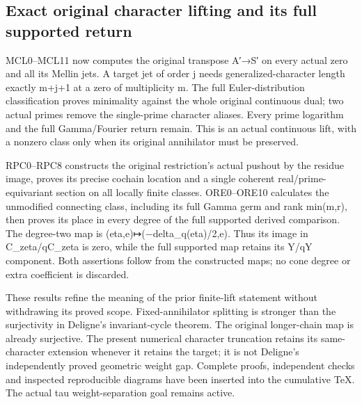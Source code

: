 \subsection{Exact original character lifting and its full supported
return}\label{exact-original-character-lifting-and-its-full-supported-return}

MCL0--MCL11 now computes the original transpose A′→S′ on every actual
zero and all its Mellin jets. A target jet of order j needs
generalized-character length exactly m+j+1 at a zero of multiplicity m.
The full Euler-distribution classification proves minimality against the
whole original continuous dual; two actual primes remove the
single-prime character aliases. Every prime logarithm and the full
Gamma/Fourier return remain. This is an actual continuous lift, with a
nonzero class only when its original annihilator must be preserved.

RPC0--RPC8 constructs the original restriction's actual pushout by the
residue image, proves its precise cochain location and a single coherent
real/prime-equivariant section on all locally finite classes.
ORE0--ORE10 calculates the unmodified connecting class, including its
full Gamma germ and rank min(m,r), then proves its place in every degree
of the full supported derived comparison. The degree-two map is
(eta,e)↦(−delta\_q(eta)/2,e). Thus its image in C\_zeta/qC\_zeta is
zero, while the full supported map retains its Y/qY component. Both
assertions follow from the constructed maps; no cone degree or extra
coefficient is discarded.

These results refine the meaning of the prior finite-lift statement
without withdrawing its proved scope. Fixed-annihilator splitting is
stronger than the surjectivity in Deligne's invariant-cycle theorem. The
original longer-chain map is already surjective. The present numerical
character truncation retains its same-character extension whenever it
retains the target; it is not Deligne's independently proved geometric
weight gap. Complete proofs, independent checks and inspected
reproducible diagrams have been inserted into the cumulative TeX. The
actual tau weight-separation goal remains active.
